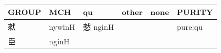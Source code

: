 \documentclass[14pt,a4paper]{scrartcl}
\begin{document}
\begin{longtable}[c]{@{}llllll@{}}
\toprule
\begin{minipage}[b]{0.14\columnwidth}\raggedright\strut
GROUP
\strut\end{minipage} &
\begin{minipage}[b]{0.14\columnwidth}\raggedright\strut
MCH
\strut\end{minipage} &
\begin{minipage}[b]{0.14\columnwidth}\raggedright\strut
qu
\strut\end{minipage} &
\begin{minipage}[b]{0.14\columnwidth}\raggedright\strut
other
\strut\end{minipage} &
\begin{minipage}[b]{0.14\columnwidth}\raggedright\strut
none
\strut\end{minipage} &
\begin{minipage}[b]{0.14\columnwidth}\raggedright\strut
PURITY
\strut\end{minipage}\tabularnewline
\midrule
\endhead
\begin{minipage}[t]{0.14\columnwidth}\raggedright\strut
猌
\strut\end{minipage} &
\begin{minipage}[t]{0.14\columnwidth}\raggedright\strut
nywinH
\strut\end{minipage} &
\begin{minipage}[t]{0.14\columnwidth}\raggedright\strut
憖 nginH
\strut\end{minipage} &
\begin{minipage}[t]{0.14\columnwidth}\raggedright\strut
\strut\end{minipage} &
\begin{minipage}[t]{0.14\columnwidth}\raggedright\strut
\strut\end{minipage} &
\begin{minipage}[t]{0.14\columnwidth}\raggedright\strut
pure:qu
\strut\end{minipage}\tabularnewline
\begin{minipage}[t]{0.14\columnwidth}\raggedright\strut
臣
\strut\end{minipage} &
\begin{minipage}[t]{0.14\columnwidth}\raggedright\strut
nginH
\strut\end{minipage} &
\begin{minipage}[t]{0.14\columnwidth}\raggedright\strut
\strut\end{minipage} &
\begin{minipage}[t]{0.14\columnwidth}\raggedright\strut

\end{minipage}
\end{longtable}
\end{document}
